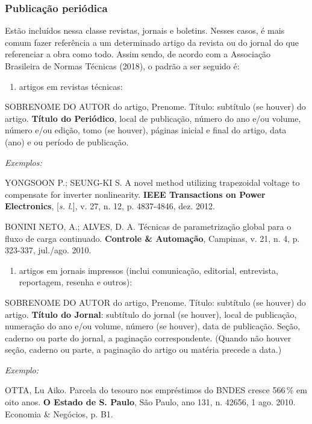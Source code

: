 \documentclass[10pt,a4paper]{article}
\newenvironment{referencias}
  {\begin{list}{}{\setlength{\leftmargin}{2.2em}\setlength{\itemsep}{\baselineskip}
     \setlength{\parsep}{0pt}\setlength{\topsep}{4pt}}
   \singlespacing\raggedright\sloppy}
  {\end{list}}
\newcommand{\referencia}{\item[]}
\newcommand{\exemplos}{\item[]{\itshape Exemplos:}\vspace{-\baselineskip}}
\newcommand{\exemplo}{\item[]{\itshape Exemplo:}\vspace{-\baselineskip}}
\begin{document}
\subsubsection*{Publicação periódica}
Estão incluídos nessa classe revistas, jornais e boletins. Nesses casos, é mais comum fazer referência a um determinado artigo da revista ou do jornal do que referenciar a obra como todo. Assim sendo, de acordo com a Associação Brasileira de Normas Técnicas (2018), o padrão a ser seguido é:
\begin{enumerate}
  \item artigos em revistas técnicas:
\end{enumerate}
\begin{referencias}
  \referencia SOBRENOME DO AUTOR do artigo, Prenome. Título: subtítulo (se houver) do artigo. \textbf{Título do Periódico}, local de publicação, número do ano e/ou volume, número e/ou edição, tomo (se houver), páginas inicial e final do artigo, data (ano) e ou período de publicação.
  \exemplos
  \referencia YONGSOON P.; SEUNG-KI S. A novel method utilizing trapezoidal voltage to compensate for inverter nonlinearity. \textbf{IEEE Transactions on Power Electronics}, [\textit{s. l.}], v. 27, n. 12, p. 4837-4846, dez. 2012.
  \referencia BONINI NETO, A.; ALVES, D. A. Técnicas de parametrização global para o fluxo de carga continuado. \textbf{Controle \& Automação}, Campinas, v. 21, n. 4, p. 323-337, jul./ago. 2010.
\end{referencias}
\begin{enumerate}[resume]
  \item artigos em jornais impressos (inclui comunicação, editorial, entrevista, reportagem, resenha e outros):
\end{enumerate}
\begin{referencias}
  \referencia SOBRENOME DO AUTOR do artigo, Prenome. Título: subtítulo (se houver) do artigo. \textbf{Título do Jornal}: subtítulo do jornal (se houver), local de publicação, numeração do ano e/ou volume, número (se houver), data de publicação. Seção, caderno ou parte do jornal, a paginação correspondente. (Quando não houver seção, caderno ou parte, a paginação do artigo ou matéria precede a data.)
  \exemplo
  \referencia OTTA, Lu Aiko. Parcela do tesouro nos empréstimos do BNDES cresce 566\,\% em oito anos. \textbf{O Estado de S. Paulo}, São Paulo, ano 131, n. 42656, 1 ago. 2010. Economia \& Negócios, p. B1.
\end{referencias}
\end{document}
